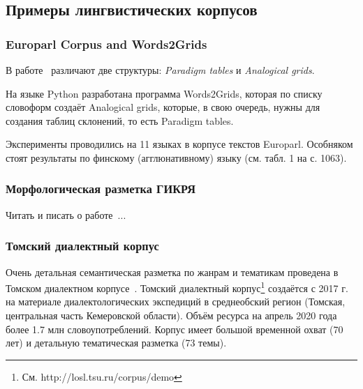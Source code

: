  \subsection{Примеры лингвистических корпусов}

 \subsubsection{Europarl Corpus and Words2Grids}

В работе~\cite{Fam2018tools} различают две структуры: \emph{Paradigm tables} 
и \emph{Analogical grids}. 

На языке Python разработана программа Words2Grids, которая по списку словоформ 
создаёт Analogical grids, которые, в свою очередь, нужны для создания 
таблиц склонений, то есть Paradigm tables.

Эксперименты проводились на 11 языках в корпусе текстов Europarl. 
Особняком стоят результаты по финскому (агглюнативному) языку (см. табл. 1 на с. 1063).


\subsubsection{Морфологическая разметка ГИКРЯ}

Читать и писать о работе~\cite{Selegey2016}...

\subsubsection{Томский диалектный корпус}
Очень детальная семантическая разметка по жанрам и тематикам проведена в Томском диалектном корпусе~\cite{Zemicheva2019}.
Томский  диалектный  корпус\footnote{ См. http://losl.tsu.ru/corpus/demo}  создаётся  с  2017  г.  на  материале  диалектологических  экспедиций  в  среднеобский  регион  (Томская,  центральная  часть  Кемеровской  области).  Объём  ресурса на  апрель 2020 года более 1.7 млн словоупотреблений. Корпус имеет большой временной охват (70 лет) и детальную тематическая разметка (73  темы). 
